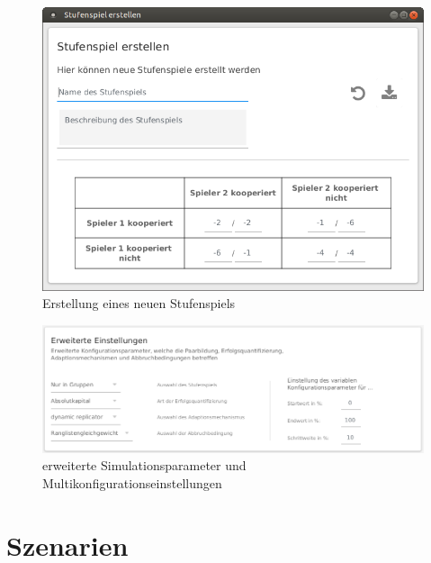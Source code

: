 \documentclass[parskip=full,11pt]{scrartcl}
\begin{document}
\begin{figure}[ht]
	\centering
	\includegraphics[width=\textwidth]{images/game.png}
	\caption{\label{fig:new_game}
		Erstellung eines neuen Stufenspiels}
\end{figure}


\begin{figure}[hb]
	\centering
	\includegraphics[width=\textwidth]{images/konfig_adv.png}
	\caption{\label{fig:konfig_adv}
		erweiterte Simulationsparameter und Multikonfigurationseinstellungen}
\end{figure}


\section{Szenarien}
\end{document}
